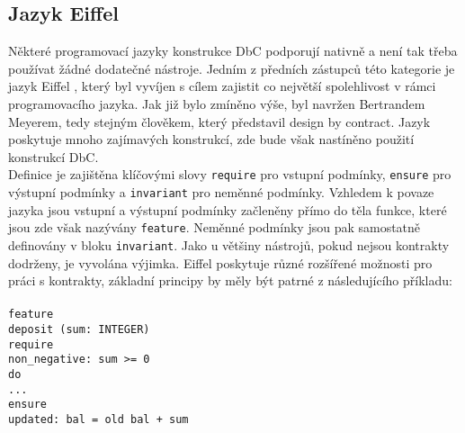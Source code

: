 		
		\subsection{Jazyk Eiffel}
			Některé programovací jazyky konstrukce DbC podporují nativně a není tak třeba používat žádné dodatečné nástroje. Jedním z předních zástupců této kategorie je jazyk Eiffel \cite{eiffel}, který byl vyvíjen s cílem zajistit co největší spolehlivost v rámci programovacího jazyka. Jak již bylo zmíněno výše, byl navržen Bertrandem Meyerem, tedy stejným člověkem, který představil design by contract. Jazyk poskytuje mnoho zajímavých konstrukcí, zde bude však nastíněno použití konstrukcí DbC.\\
			
			 Definice je zajištěna klíčovými slovy \texttt{require} pro vstupní podmínky, \texttt{ensure} pro výstupní podmínky a \texttt{invariant} pro neměnné podmínky. Vzhledem k povaze jazyka jsou vstupní a výstupní podmínky začleněny přímo do těla funkce, které jsou zde však nazývány \texttt{feature}. Neměnné podmínky jsou pak samostatně definovány v bloku \texttt{invariant}. Jako u většiny nástrojů, pokud nejsou kontrakty dodrženy, je vyvolána výjimka. Eiffel poskytuje různé rozšířené možnosti pro práci s kontrakty, základní principy by měly být patrné z následujícího příkladu:\\\\
			\- \- \- \- \- \texttt{feature}\\
			\- \- \- \- \- \- \- \- \- \- \texttt{deposit (sum: INTEGER)}\\
			\- \- \- \- \- \- \- \- \- \- \- \- \- \- \- \texttt{require}\\
			\- \- \- \- \- \- \- \- \- \- \- \- \- \- \- \- \- \- \- \- \texttt{non\_negative: sum \textgreater = 0}\\
			\- \- \- \- \- \- \- \- \- \- \- \- \- \- \- \texttt{do}\\
			\- \- \- \- \- \- \- \- \- \- \- \- \- \- \- \- \- \- \- \- \texttt{...}\\
			\- \- \- \- \- \- \- \- \- \- \- \- \- \- \- \texttt{ensure}\\
			\- \- \- \- \- \- \- \- \- \- \- \- \- \- \- \- \- \- \- \- \texttt{updated: bal = old bal + sum}

